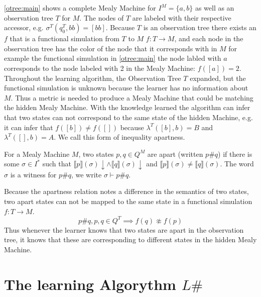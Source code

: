 \autoref{otree:main} shows a complete Mealy Machine for $I^M=\{a,b\}$ as well as an observation tree $T$ for $M$. The nodes of $T$ are labeled with their respective accessor, e.g. $\sigma^T(q_0^T,bb)=[bb]$. Because $T$ is an observation tree there exists an $f$ that is a functional simulation from $T$ to $M$ $f:T\rightarrow M$, and each node in the observation tree has the color of the node that it corresponds with in $M$ for example the functional simulation in \autoref{otree:main} the node labled with $a$ corresponds to the node labeled with 2 in the Mealy Machine: $f([a])=2$.\\
Throughout the learning algorithm, the Observation Tree $T$ expanded, but the functional simulation is unknown because the learner has no information about $M$. Thus a metric is needed to produce a Mealy Machine that could be matching the hidden Mealy Machine. With the knowledge learned the algorithm can infer that two states can not correspond to the same state of the hidden Machine, e.g. it can infer that $f([b])\neq f([])$ because $\lambda^T([b],b)=B$ and $\lambda^T([],b)=A$. We call this form of inequality apartness. 
\begin{definition} \label{def:apart}
	For a Mealy Machine $M$, two states $p,q\in Q^M$ are apart (written $p\#q$) if there is some $\sigma\in I^*$ such that $\llbracket p\rrbracket(\sigma)\downarrow\land\llbracket q\rrbracket(\sigma)\downarrow$ and $\llbracket p\rrbracket(\sigma)\neq\llbracket q\rrbracket(\sigma)$. The word $\sigma$ is a witness for $p\#q$, we write $\sigma\vdash p\#q$.
\end{definition}
Because the apartness relation notes a difference in the semantics of two states, two apart states can not be mapped to the same state in a functional simulation $f:T\rightarrow M$. $$
p\#q, p,q\in Q^T\implies f(q)\not\approx f(p)
$$
Thus whenever the learner knows that two states are apart in the observation tree, it knows that these are corresponding to different states in the hidden Mealy Machine.
\section{The learning Algorythm $L\#$}

